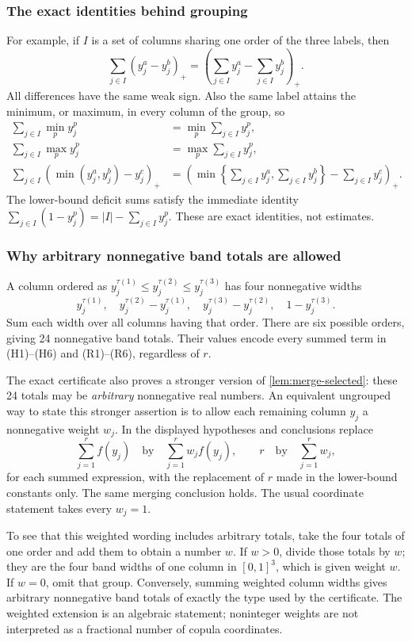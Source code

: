 \documentclass[a4paper,11pt]{amsart}
\numberwithin{equation}{section}
\theoremstyle{definition}
\theoremstyle{remark}
\begin{document}
\subsubsection{The exact identities behind grouping}
For example, if $I$ is a set of columns sharing one order of the three labels,
then
\[
 \sum_{j\in I}(y_j^a-y_j^b)_+
 =\left(\sum_{j\in I}y_j^a-\sum_{j\in I}y_j^b\right)_+.
\]
All differences have the same weak sign. Also the same label attains the
minimum, or maximum, in every column of the group, so
\begin{align*}
 \sum_{j\in I}\min_p y_j^p&=\min_p\sum_{j\in I}y_j^p,\\
 \sum_{j\in I}\max_p y_j^p&=\max_p\sum_{j\in I}y_j^p,\\
 \sum_{j\in I}(\min(y_j^a,y_j^b)-y_j^c)_+
 &=\left(\min\left\{\sum_{j\in I}y_j^a,\sum_{j\in I}y_j^b\right\}
                     -\sum_{j\in I}y_j^c\right)_+.
\end{align*}
The lower-bound deficit sums satisfy the immediate identity
$\sum_{j\in I}(1-y_j^p)=|I|-\sum_{j\in I}y_j^p$.
These are exact identities, not estimates.

\subsubsection{Why arbitrary nonnegative band totals are allowed}
A column ordered as $y_j^{\tau(1)}\le y_j^{\tau(2)}\le y_j^{\tau(3)}$
has four nonnegative widths
\[
 y_j^{\tau(1)},\quad y_j^{\tau(2)}-y_j^{\tau(1)},\quad
 y_j^{\tau(3)}-y_j^{\tau(2)},\quad1-y_j^{\tau(3)}.
\]
Sum each width over all columns having that order. There are six possible
orders, giving 24 nonnegative band totals. Their values encode every summed
term in (H1)--(H6) and (R1)--(R6), regardless of $r$.

The exact certificate also proves a stronger version of
\cref{lem:merge-selected}: these 24 totals may be \emph{arbitrary} nonnegative real numbers.
An equivalent ungrouped way to state this stronger assertion is to allow each
remaining column $y_j$ a nonnegative weight $w_j$. In the displayed
hypotheses and conclusions replace
\[
 \sum_{j=1}^r f(y_j)\quad\text{by}\quad\sum_{j=1}^r w_j f(y_j),
 \qquad r\quad\text{by}\quad\sum_{j=1}^r w_j,
\]
for each summed expression, with the replacement of $r$ made in the
lower-bound constants only. The same merging conclusion
holds. The usual coordinate statement takes every $w_j=1$.

To see that this weighted wording includes arbitrary totals, take the four
totals of one order and add them to obtain a number $w$. If $w>0$, divide
those totals by $w$; they are the four band widths of one column in $[0,1]^3$,
which is given weight $w$. If $w=0$, omit that group. Conversely, summing
weighted column widths gives arbitrary nonnegative band totals of exactly
the type used by the certificate. The weighted extension is an algebraic
statement; noninteger weights are not interpreted as a fractional number of
copula coordinates.
\end{document}
